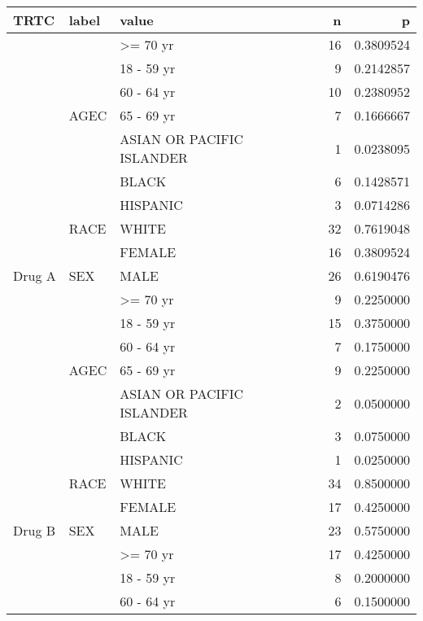 \documentclass[]{article}
\begin{document}
\begin{table}[H]
\centering
\begin{tabular}{l|l|l|r|r}
\hline
TRTC & label & value & n & p\\
\hline
 &  & >= 70 yr & 16 & 0.3809524\\
\cline{3-5}
 &  & 18 - 59 yr & 9 & 0.2142857\\
\cline{3-5}
 &  & 60 - 64 yr & 10 & 0.2380952\\
\cline{3-5}
 & \multirow{-4}{*}{\raggedright\arraybackslash AGEC} & 65 - 69 yr & 7 & 0.1666667\\
\cline{2-5}
 &  & ASIAN OR PACIFIC ISLANDER & 1 & 0.0238095\\
\cline{3-5}
 &  & BLACK & 6 & 0.1428571\\
\cline{3-5}
 &  & HISPANIC & 3 & 0.0714286\\
\cline{3-5}
 & \multirow{-4}{*}{\raggedright\arraybackslash RACE} & WHITE & 32 & 0.7619048\\
\cline{2-5}
 &  & FEMALE & 16 & 0.3809524\\
\cline{3-5}
\multirow{-10}{*}{\raggedright\arraybackslash Drug A} & \multirow{-2}{*}{\raggedright\arraybackslash SEX} & MALE & 26 & 0.6190476\\
\cline{1-5}
 &  & >= 70 yr & 9 & 0.2250000\\
\cline{3-5}
 &  & 18 - 59 yr & 15 & 0.3750000\\
\cline{3-5}
 &  & 60 - 64 yr & 7 & 0.1750000\\
\cline{3-5}
 & \multirow{-4}{*}{\raggedright\arraybackslash AGEC} & 65 - 69 yr & 9 & 0.2250000\\
\cline{2-5}
 &  & ASIAN OR PACIFIC ISLANDER & 2 & 0.0500000\\
\cline{3-5}
 &  & BLACK & 3 & 0.0750000\\
\cline{3-5}
 &  & HISPANIC & 1 & 0.0250000\\
\cline{3-5}
 & \multirow{-4}{*}{\raggedright\arraybackslash RACE} & WHITE & 34 & 0.8500000\\
\cline{2-5}
 &  & FEMALE & 17 & 0.4250000\\
\cline{3-5}
\multirow{-10}{*}{\raggedright\arraybackslash Drug B} & \multirow{-2}{*}{\raggedright\arraybackslash SEX} & MALE & 23 & 0.5750000\\
\cline{1-5}
 &  & >= 70 yr & 17 & 0.4250000\\
\cline{3-5}
 &  & 18 - 59 yr & 8 & 0.2000000\\
\cline{3-5}
 &  & 60 - 64 yr & 6 & 0.1500000\\

\end{tabular}
\end{table}
\end{document}
